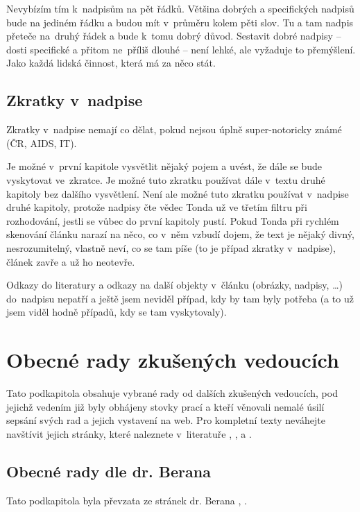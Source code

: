 Nevybízím tím k~nadpisům na pět řádků. Většina dobrých a specifických nadpisů bude na jediném řádku a budou mít v~průměru kolem pěti slov. Tu a tam nadpis přeteče na~druhý řádek a bude k~tomu dobrý důvod. Sestavit dobré nadpisy -- dosti specifické a přitom ne~příliš dlouhé -- není lehké, ale vyžaduje to přemýšlení. Jako každá lidská činnost, která má za něco stát.

\subsection*{Zkratky v~nadpise}
Zkratky v~nadpise nemají co dělat, pokud nejsou úplně super-notoricky známé (ČR, AIDS, IT).

Je možné v~první kapitole vysvětlit nějaký pojem a uvést, že dále se bude vyskytovat ve~zkratce. Je možné tuto zkratku používat dále v~textu druhé kapitoly bez dalšího vysvětlení. Není ale možné tuto zkratku používat v~nadpise druhé kapitoly, protože nadpisy čte vědec Tonda už ve třetím filtru při rozhodování, jestli se vůbec do první kapitoly pustí. Pokud Tonda při rychlém skenování článku narazí na něco, co v~něm vzbudí dojem, že text je nějaký divný, nesrozumitelný, vlastně neví, co se tam píše (to je případ zkratky v~nadpise), článek zavře a už ho neotevře.

Odkazy do literatury a odkazy na další objekty v~článku (obrázky, nadpisy, \ldots) do~nadpisu nepatří a ještě jsem neviděl případ, kdy by tam byly potřeba (a to už jsem viděl hodně případů, kdy se tam vyskytovaly).

\section{Obecné rady zkušených vedoucích}

Tato podkapitola obsahuje vybrané rady od dalších zkušených vedoucích, pod jejichž vedením již byly obhájeny stovky prací a kteří věnovali nemalé úsilí sepsání svých rad a jejich vystavení na web. Pro kompletní texty neváhejte navštívit jejich stránky, které naleznete v~literatuře \cite{Beran}, \cite{BeranPDF}, \cite{Cernocky} a \cite{Zemcik}.

\subsection*{Obecné rady dle dr. Berana}
Tato podkapitola byla převzata ze stránek dr. Berana \cite{Beran}, \cite{BeranPDF}.

